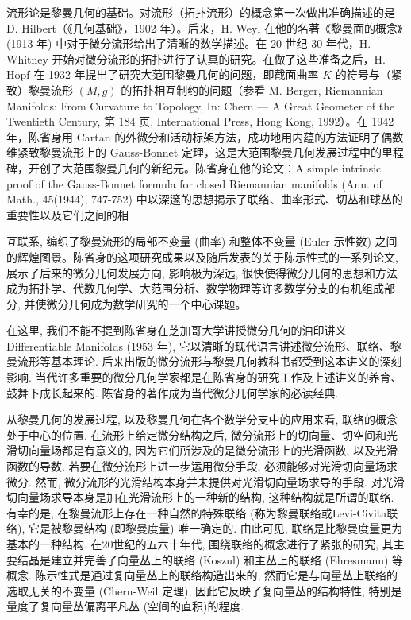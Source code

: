 流形论是黎曼几何的基础。对流形（拓扑流形）的概念第一次做出准确描述的是 D. Hilbert（《几何基础》，1902 年）。后来，H. Weyl 在他的名著《黎曼面的概念》(1913 年) 中对于微分流形给出了清晰的数学描述。在 20 世纪 30 年代，H. Whitney 开始对微分流形的拓扑进行了认真的研究。在做了这些准备之后，H. Hopf 在 1932 年提出了研究大范围黎曼几何的问题，即截面曲率  $K$  的符号与（紧致）黎曼流形  $(M, g)$  的拓扑相互制约的问题（参看 M. Berger, Riemannian Manifolds: From Curvature to Topology, In: Chern — A Great Geometer of the Twentieth Century, 第 184 页, International Press, Hong Kong, 1992）。在 1942 年，陈省身用 Cartan 的外微分和活动标架方法，成功地用内蕴的方法证明了偶数维紧致黎曼流形上的 Gauss-Bonnet 定理，这是大范围黎曼几何发展过程中的里程碑，开创了大范围黎曼几何的新纪元。陈省身在他的论文：A simple intrinsic proof of the Gauss-Bonnet formula for closed Riemannian manifolds (Ann. of Math., 45(1944), 747-752) 中以深邃的思想揭示了联络、曲率形式、切丛和球丛的重要性以及它们之间的相

互联系, 编织了黎曼流形的局部不变量 (曲率) 和整体不变量 (Euler 示性数) 之间的辉煌图景。陈省身的这项研究成果以及随后发表的关于陈示性式的一系列论文, 展示了后来的微分几何发展方向, 影响极为深远, 很快使得微分几何的思想和方法成为拓扑学、代数几何学、大范围分析、数学物理等许多数学分支的有机组成部分, 并使微分几何成为数学研究的一个中心课题。

在这里, 我们不能不提到陈省身在芝加哥大学讲授微分几何的油印讲义 Differentiable Manifolds (1953 年), 它以清晰的现代语言讲述微分流形、联络、黎曼流形等基本理论. 后来出版的微分流形与黎曼几何教科书都受到这本讲义的深刻影响. 当代许多重要的微分几何学家都是在陈省身的研究工作及上述讲义的养育、鼓舞下成长起来的. 陈省身的著作成为当代微分几何学家的必读经典.

从黎曼几何的发展过程, 以及黎曼几何在各个数学分支中的应用来看, 联络的概念处于中心的位置. 在流形上给定微分结构之后, 微分流形上的切向量、切空间和光滑切向量场都是有意义的, 因为它们所涉及的是微分流形上的光滑函数, 以及光滑函数的导数. 若要在微分流形上进一步运用微分手段, 必须能够对光滑切向量场求微分. 然而, 微分流形的光滑结构本身并未提供对光滑切向量场求导的手段. 对光滑切向量场求导本身是加在光滑流形上的一种新的结构, 这种结构就是所谓的联络. 有幸的是, 在黎曼流形上存在一种自然的特殊联络 (称为黎曼联络或Levi-Civita联络), 它是被黎曼结构 (即黎曼度量) 唯一确定的. 由此可见, 联络是比黎曼度量更为基本的一种结构. 在20世纪的五六十年代, 围绕联络的概念进行了紧张的研究, 其主要结晶是建立并完善了向量丛上的联络 (Koszul) 和主丛上的联络 (Ehresmann) 等概念. 陈示性式是通过复向量丛上的联络构造出来的, 然而它是与向量丛上联络的选取无关的不变量 (Chern-Weil 定理), 因此它反映了复向量丛的结构特性, 特别是量度了复向量丛偏离平凡丛 (空间的直积)的程度.

